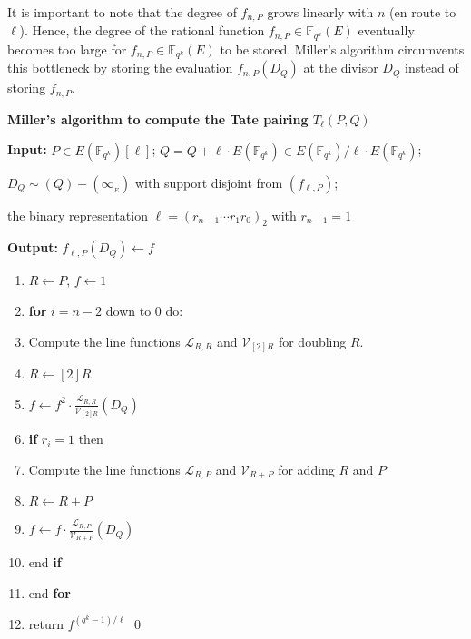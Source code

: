 \documentclass[a4paper, 11pt]{scrreprt}
\numberwithin{equation}{section}
\newcommand{\bF}{\mathbb F}
\newcommand{\bFqk}{\mathbb{F}_{q^k}}
\newcommand{\wti}{\widetilde}
\newcommand{\mc}{\mathcal}
\newcommand{\vs}{\vspace{-2mm}}
\newcommand{\noin}{\noindent}
\theoremstyle{plain}
\begin{document}
It is important to note that the degree of $f_{n,P}$ grows linearly with $n$ (en route to $\ell$). Hence, the degree of the rational function $f_{n,P}\in \bFqk(E)$ eventually becomes too large for $f_{n,P}\in \bFqk(E)$ to be stored. Miller's algorithm circumvents this bottleneck by storing the evaluation $f_{n,P}(D_Q)$ at the divisor $D_Q$ instead of storing $f_{n,P}$. 



\bigskip

\begin{mdframed} \textbf{Miller's algorithm to compute  the Tate pairing $T_{\ell}(P,Q)$} \vspace{0.15cm}

\noin \textbf{Input:} $P\in E(\bFqk)[\ell]$;\hspace{1mm} $Q  =\wti{Q}+ \ell \cdot E(\bF _ {q^k})\in E(\bF _ {q^k})/\ell \cdot E(\bF _ {q^k}) $; 

\noin $D_{Q}\sim (Q)-(\infty_{_E})$ with support disjoint from $(f_{\ell,P})$; 

\noin the binary representation $\ell = (r_{n-1}\cdots r_1 r_0)_2$ with $r_{n-1} = 1$ \vspace{0.15cm}

\noin \textbf{Output:} $f_{\ell,P}(D_Q)\gets f$ \vspace{0.15cm}

\begin{enumerate}[wide, labelwidth=!, labelindent=0pt]\vs \item $R\gets P$, $f\gets 1$

\item \textbf{for} $i = n-2$ down to $0$ do:

\item Compute the line functions $\mc{L}_{R,R}$ and $\mc{V}_{[2]R}$ for doubling $R$.

\item $R\gets [2]R$

\item $f\gets f^2\cdot \frac{\mc{L}_{R,R}}{\mc{V}_{[2]R}}(D_Q)$

\item \textbf{if} $r_i =1$ then 

\item Compute the line functions $\mc{L}_{R,P}$ and $\mc{V}_{R+P}$ for adding $R$ and $P$

\item $R\gets R+P$

\item $f\gets f\cdot \frac{\mc{L}_{R,P}}{\mc{V}_{R+P}}(D_Q)$

\item end \textbf{if}

\item end \textbf{for}

\item return $f^{(q^k-1)/{\ell}}$ \qed \end{enumerate} \end{mdframed}
\end{document}

